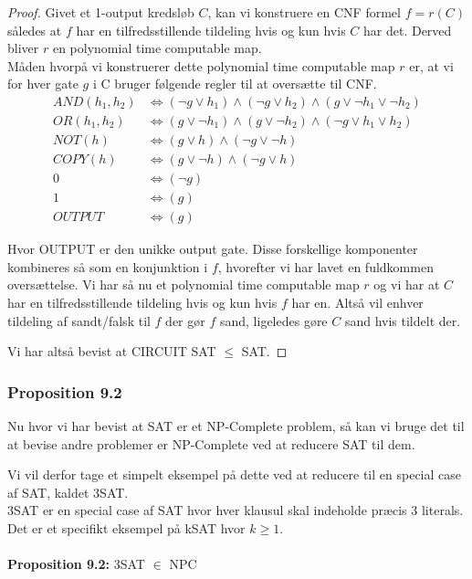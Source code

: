 \begin{proof}
 Givet et 1-output kredsløb $C$, kan vi konstruere en CNF formel $f = r(C)$ således at $f$ har en tilfredsstillende tildeling hvis og kun hvis $C$ har det. Derved bliver $r$ en polynomial time computable map.\\

Måden hvorpå vi konstruerer dette polynomial time computable map $r$ er, at vi for hver gate $g$ i C bruger følgende regler til at oversætte til CNF.
\begin{align*}
 AND(h_1,h_2) &\Leftrightarrow (\neg g \vee h_1) \wedge (\neg g \vee h_2) \wedge (g \vee \neg h_1 \vee \neg h_2) \\
 OR(h_1,h_2) &\Leftrightarrow (g \vee \neg h_1) \wedge (g \vee \neg h_2) \wedge (\neg g \vee h_1 \vee h_2) \\
 NOT(h) &\Leftrightarrow (g \vee h) \wedge (\neg g \vee \neg h) \\
 COPY(h) &\Leftrightarrow (g \vee \neg h) \wedge (\neg g \vee h) \\
 0 &\Leftrightarrow (\neg g) \\
 1 &\Leftrightarrow (g) \\
 OUTPUT &\Leftrightarrow (g)
\end{align*}

Hvor OUTPUT er den unikke output gate. Disse forskellige komponenter kombineres så som en konjunktion i $f$, hvorefter vi har lavet en fuldkommen oversættelse. Vi har så nu et polynomial time computable map $r$ og vi har at $C$ har en tilfredsstillende tildeling hvis og kun hvis $f$ har en. Altså vil enhver tildeling af sandt/falsk til $f$ der gør $f$ sand, ligeledes gøre $C$ sand hvis tildelt der.

Vi har altså bevist at CIRCUIT SAT $\leq$ SAT.
   
\end{proof}


\subsubsection{Proposition 9.2}

Nu hvor vi har bevist at SAT er et NP-Complete problem, så kan vi bruge det til at bevise andre problemer er NP-Complete ved at reducere SAT til dem.

Vi vil derfor tage et simpelt eksempel på dette ved at reducere til en special case af SAT, kaldet 3SAT.\\
3SAT er en special case af SAT hvor hver klausul skal indeholde præcis 3 literals. Det er et specifikt eksempel på kSAT hvor $k \geq 1$.\\
~\\
\textbf{Proposition 9.2:} 3SAT $\in$ NPC

